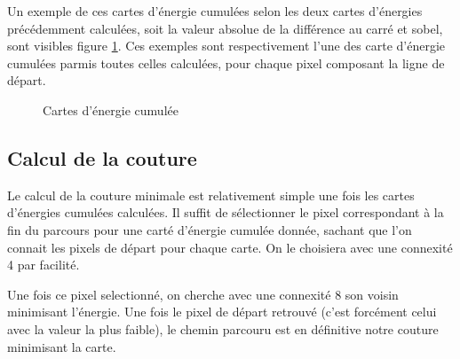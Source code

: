 \documentclass[a4paper]{article}
\begin{document}
Un exemple de ces cartes d'énergie cumulées selon les deux cartes d'énergies précédemment calculées, soit la
valeur absolue de la différence au carré et sobel, sont visibles figure \ref{ecum}. Ces exemples sont
respectivement l'une des carte d'énergie cumulées parmis toutes celles calculées, pour chaque pixel composant la ligne de départ.

\begin{figure}[!ht]%
    \centering
    \hspace{0.030\textwidth}
    \caption{Cartes d'énergie cumulée}
    \label{ecum}
\end{figure}

\subsection{Calcul de la couture}

Le calcul de la couture minimale est relativement simple une fois les cartes d'énergies cumulées calculées. 
Il suffit de sélectionner le pixel correspondant à la fin du parcours pour une carté d'énergie cumulée donnée,
sachant que l'on connait les pixels de départ pour chaque carte. On le choisiera avec une connexité 4 par
facilité.

Une fois ce pixel selectionné, on cherche avec une connexité 8 son voisin minimisant l'énergie.
Une fois le pixel de départ retrouvé (c'est forcément celui avec la valeur la plus faible), le chemin
parcouru est en définitive notre couture minimisant la carte.
\end{document}
